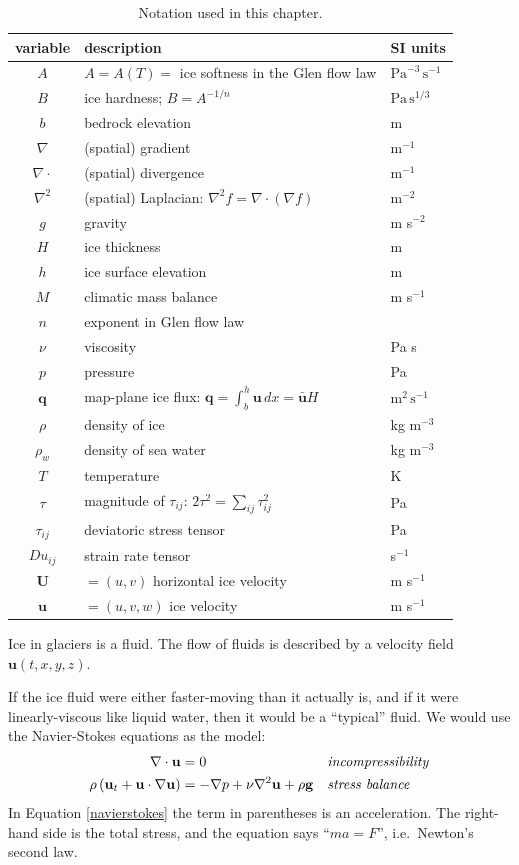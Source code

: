 \documentclass[titlepage,a4paper,final,12pt]{scrartcl}
\newcommand{\bq}{\mathbf{q}}
\begin{document}
\begin{table}
\caption{Notation used in this chapter.}
\label{tab:notation}
\begin{tabular}{cll}
variable  & description & SI units \\ 
\hline
$A$ & $A=A(T)=$ ice softness in the Glen flow law & $\text{Pa}^{-3}\,\text{s}^{-1}$ \\
$B$ & ice hardness; $B=A^{-1/n}$ & $\text{Pa}\,\text{s}^{1/3}$ \\
$b$ & bedrock elevation & m \\
$\nabla$ & (spatial) gradient & m$^{-1}$ \\
$\nabla\cdot$ & (spatial) divergence & m$^{-1}$ \\
$\nabla^2$ & (spatial) Laplacian: $\nabla^2 f = \nabla\cdot(\nabla f)$ & m$^{-2}$ \\
$g$ & gravity & m s$^{-2}$ \\
$H$ & ice thickness & m \\
$h$ & ice surface elevation & m \\
$M$ & climatic mass balance & m s$^{-1}$ \\
$n$ & exponent in Glen flow law & \\
$\nu$ & viscosity & Pa s \\
$p$ & pressure & Pa \\
$\bq$ & map-plane ice flux: $\bq = \int_{b}^{h} \mathbf{u}\,dx = \bar{\mathbf{u}} H$ & $\text{m}^2\,\text{s}^{-1}$ \\
$\rho$ & density of ice & kg m$^{-3}$ \\
$\rho_w$ & density of sea water & kg m$^{-3}$ \\
$T$ & temperature & K \\
$\tau$ & magnitude of $\tau_{ij}$: $2 \tau^2 = \sum_{ij} \tau_{ij}^2$ & Pa \\
$\tau_{ij}$ & deviatoric stress tensor & Pa \\
$Du_{ij}$ & strain rate tensor & s$^{-1}$ \\
$\mathbf{U}$ & $=(u,v)$ horizontal ice velocity & m s$^{-1}$ \\
$\mathbf{u}$ & $=(u,v,w)$ ice velocity & m s$^{-1}$ \\
\end{tabular}
\end{table}

Ice in glaciers is a fluid.  The flow of fluids is described by a velocity field $\mathbf{u}(t,x,y,z)$.

If the ice fluid were either faster-moving than it actually is, and if it were linearly-viscous like liquid water, then it would be a ``typical'' fluid.  We would use the Navier-Stokes equations as the model:
\begin{align}
\nabla \cdot \mathbf{u} &= 0 &&\text{\emph{incompressibility}} \label{incompressible} \\
\rho \left(\mathbf{u}_t + \mathbf{u}\cdot\nabla \mathbf{u}\right) &= -\nabla p + \nu \nabla^2 \mathbf{u} + \rho \mathbf{g} &&\text{\emph{stress balance}} \label{navierstokes}
\end{align}
In Equation \eqref{navierstokes} the term in parentheses is an acceleration.  The right-hand side is the total stress, and the equation says ``$ma=F$'', i.e.~Newton's second law.
\end{document}
